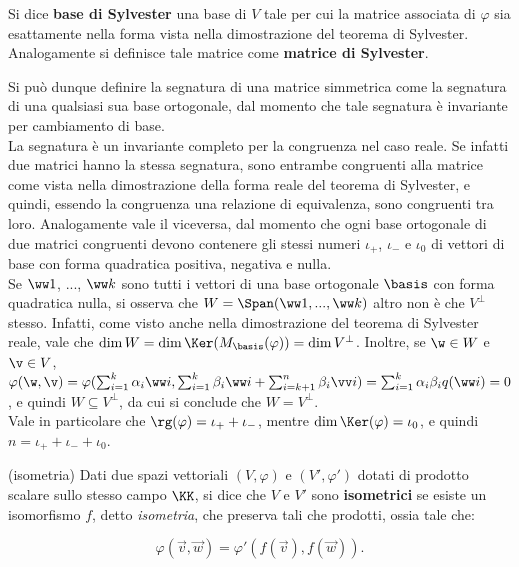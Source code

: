 \documentclass[11pt]{article}
\begin{document}
	\begin{definition}
		Si dice \textbf{base di Sylvester} una base di $V$ tale per cui la
		matrice associata di $\varphi$ sia esattamente nella forma
		vista nella dimostrazione del teorema di Sylvester. Analogamente
		si definisce tale matrice come \textbf{matrice di Sylvester}.
	\end{definition}

	\begin{remark} \nl
		\li Si può dunque definire la segnatura di una matrice simmetrica
		come la segnatura di una qualsiasi sua base ortogonale, dal
		momento che tale segnatura è invariante per cambiamento di base. \\
		\li La segnatura è un invariante completo per la congruenza nel caso reale. Se infatti due matrici hanno la stessa segnatura, sono
		entrambe congruenti alla matrice come vista nella dimostrazione
		della forma reale del teorema di Sylvester, e quindi, essendo
		la congruenza una relazione di equivalenza, sono congruenti
		tra loro. Analogamente vale il viceversa, dal momento che ogni
		base ortogonale di due matrici congruenti devono contenere gli
		stessi numeri $\iota_+$, $\iota_-$ e $\iota_0$ di vettori
		di base con forma quadratica positiva, negativa e nulla. \\
		\li Se $\ww 1$, ..., $\ww k$ sono tutti i vettori di una base
		ortogonale $\basis$ con forma quadratica nulla, si osserva che $W = \Span(\ww 1, ..., \ww k)$ altro non è che $V^\perp$ stesso. Infatti, come
		visto anche nella dimostrazione del teorema di Sylvester reale, vale
		che	$\dim W = \dim \Ker (M_\basis(\varphi)) = \dim V^\perp$. Inoltre,
		se $\w \in W$ e $\v \in V$, $\varphi(\w, \v) = \varphi(\sum_{i=1}^k
		\alpha_i \ww i, \sum_{i=1}^k \beta_i \ww i + \sum_{i=k+1}^n \beta_i \vv i)
		= \sum_{i=1}^k \alpha_i \beta_i q(\ww i) = 0$, e quindi
		$W \subseteq V^\perp$, da cui si conclude che $W = V^\perp$. \\
		\li Vale in particolare che $\rg(\varphi) = \iota_+ + \iota_-$, mentre
		$\dim \Ker(\varphi) = \iota_0$, e quindi $n = \iota_+ + \iota_- + \iota_0$.
	\end{remark}

	\begin{definition} (isometria)
		Dati due spazi vettoriali $(V, \varphi)$ e
		$(V', \varphi')$ dotati di prodotto scalare sullo stesso campo $\KK$, si dice che
		$V$ e $V'$ sono \textbf{isometrici} se esiste un isomorfismo
		$f$, detto \textit{isometria}, che preserva tali che prodotti, ossia tale che:
		
		\[ \varphi(\vec v, \vec w) = \varphi'(f(\vec v), f(\vec w)). \]
	\end{definition}
\end{document}
